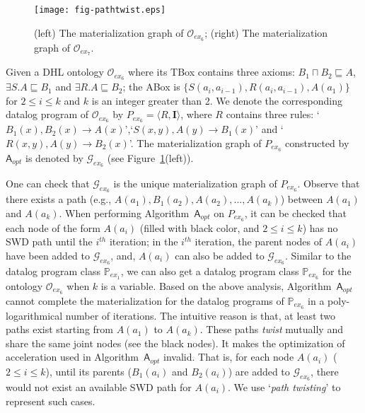 \documentclass[final,1p,times]{elsarticle}
\begin{document}
\begin{figure}[htbp]
\begin{center}
\texttt{[image: fig-pathtwist.eps]}
\caption{(left) The materialization graph of $\mathcal{O}_{ex_6}$;
(right) The materialization graph of $\mathcal{O}_{ex_7}$.}
\label{fig:ex3_4}
\end{center}
\end{figure}

\begin{example}\label{exp:dhl}
Given a DHL ontology $\mathcal{O}_{ex_6}$ where its TBox contains three axioms:
$B_1\sqcap B_2\sqsubseteq A$, $\exists S.A\sqsubseteq B_1$ and $\exists R.A\sqsubseteq B_2$;
the ABox is $\{S(a_i,a_{i-1}), R(a_i,a_{i-1}), A(a_1)\}$
for $2\leq i\leq k$ and $k$ is an integer greater than 2.
We denote the corresponding datalog program of $\mathcal{O}_{ex_6}$ by $P_{ex_6}=\langle R, \textbf{I}\rangle$,
where $R$ contains three rules: `$B_1(x),B_2(x)\rightarrow A(x)$',`$S(x,y),A(y)\rightarrow B_1(x)$' and `$R(x,y),A(y)\rightarrow B_2(x)$'.
The materialization graph of $P_{ex_6}$ constructed by $\mathsf{A}_{opt}$ is denoted by $\mathcal{G}_{ex_6}$ (see Figure~\ref{fig:ex3_4}(left)).
\end{example}

One can check that $\mathcal{G}_{ex_6}$ is the unique materialization graph of $P_{ex_6}$.
Observe that there exists a path (e.g., $A(a_1),B_1(a_2),A(a_2),...,A(a_k)$) between $A(a_1)$ and $A(a_k)$.
When performing Algorithm~$\mathsf{A}_{opt}$ on $P_{ex_6}$, it can be checked that
each node of the form $A(a_i)$ (filled with black color,
and $2\leq i\leq k$) has no SWD path until the $i^{th}$ iteration;
in the $i^{th}$ iteration, the parent nodes of $A(a_i)$ have been added to $\mathcal{G}_{ex_6}$,
and, $A(a_i)$ can also be added to $\mathcal{G}_{ex_6}$.
Similar to the datalog program class $\mathbb{P}_{ex_1}$, we can also get a
datalog program class $\mathbb{P}_{ex_6}$ for the ontology $\mathcal{O}_{ex_6}$
when $k$ is a variable. Based on the above analysis, Algorithm~$\mathsf{A}_{opt}$ cannot complete the materialization
for the datalog programs of $\mathbb{P}_{ex_6}$ in a poly-logarithmical
number of iterations.
The intuitive reason is that, at least two paths exist
starting from $A(a_1)$ to $A(a_k)$. These paths \emph{twist} mutually and share the same joint nodes (see the black nodes).
It makes the optimization of acceleration used in Algorithm~$\mathsf{A}_{opt}$ invalid.
That is, for each node $A(a_i)$ ($2\leq i\leq k$), until its parents ($B_1(a_i)$ and $B_2(a_i)$) are added
to $\mathcal{G}_{ex_6}$, there would not exist an available SWD path for $A(a_i)$.
We use `\emph{path twisting}' to represent such cases.
\end{document}
